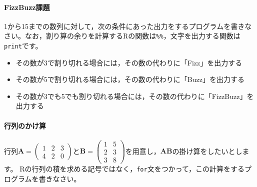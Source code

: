 \documentclass{ltjsbook}
\begin{document}
\paragraph{FizzBuzz課題}
1から15までの数列に対して，次の条件にあった出力をするプログラムを書きなさい。なお，割り算の余りを計算するRの関数は\verb|%%|，文字を出力する関数は\verb|print|です。
\begin{itemize}
	\item その数が3で割り切れる場合には，その数の代わりに「Fizz」を出力する
	\item その数が5で割り切れる場合には，その数の代わりに「Buzz」を出力する
	\item その数が3でも5でも割り切れる場合には，その数の代わりに「FizzBuzz」を出力する
\end{itemize}

\paragraph{行列のかけ算}
行列$\bm{A} = \begin{pmatrix}1&2&3\\4&2&0\end{pmatrix}$と$\bm{B}=\begin{pmatrix}1&5\\2&3\\3&8\end{pmatrix}$を用意し，$\bm{AB}$の掛け算をしたいとします。
Rの行列の積を求める記号ではなく，\verb|for|文をつかって，この計算をするプログラムを書きなさい。
\end{document}
